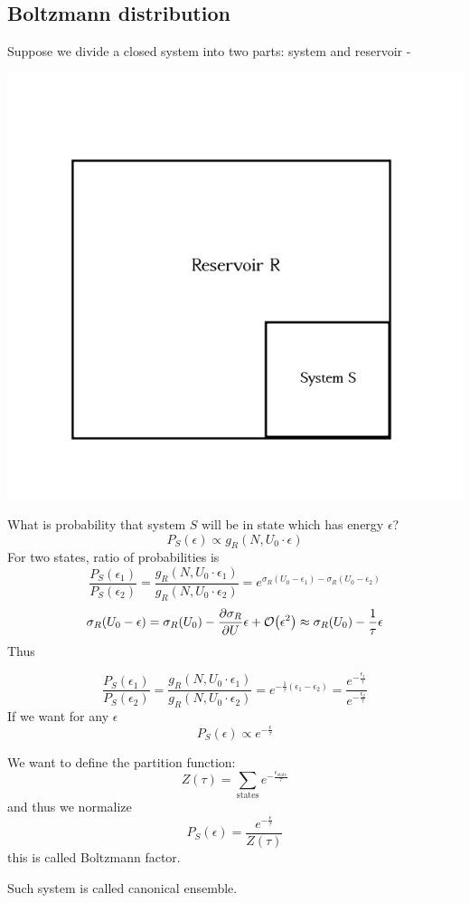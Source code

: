 \subsection{Boltzmann distribution}
Suppose we divide a closed system into two parts: system and reservoir - 
\begin{center}
	\includegraphics[width=0.5\linewidth]{./lect5/pic1.png}
\end{center}
What is probability that system $S$ will be in state which has energy $\epsilon$?
$$P_S(\epsilon)  \propto g_R(N,U_0 \cdot \epsilon)$$
For two states, ratio of probabilities is
$$\frac{P_S(\epsilon_1)}{P_S(\epsilon_2)} = \frac{g_R(N,U_0 \cdot \epsilon_1)}{g_R(N,U_0 \cdot \epsilon_2)} = e^{\sigma_R(U_0-\epsilon_1)-\sigma_R(U_0-\epsilon_2)}$$ 
$$\sigma_R(U_0 -\epsilon) = \sigma_R(U_0) - \pdv{\sigma_R}{U}\epsilon + \order{\epsilon^2} \approx  \sigma_R(U_0) - \frac{1}{\tau} \epsilon$$
Thus

$$\frac{P_S(\epsilon_1)}{P_S(\epsilon_2)} = \frac{g_R(N,U_0 \cdot \epsilon_1)}{g_R(N,U_0 \cdot \epsilon_2)} = e^{-\frac{1}{\tau} (\epsilon_1-\epsilon_2)} = \frac{ e^{-\frac{\epsilon_1}{\tau}}}{ e^{-\frac{\epsilon_2}{\tau}}}$$ 
If we want for any $\epsilon$
$$P_S(\epsilon) \propto e^{-\frac{\epsilon}{\tau}}$$

We want to define the partition function:
$$Z(\tau) = \sum_{\text{states}} e^{-\frac{\epsilon_{\text{state}}}{\tau}}$$
and thus we normalize
$$P_S(\epsilon) = \frac{e^{-\frac{\epsilon}{\tau}}}{Z(\tau)}$$
this is called Boltzmann factor.

Such system is called canonical ensemble.
